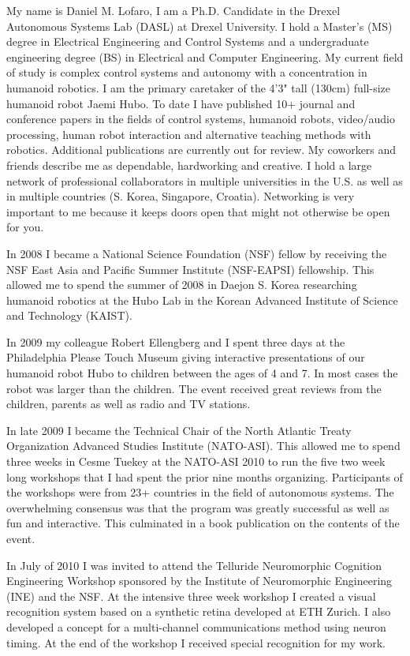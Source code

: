 \documentclass[12pt]{article}
\begin{document}
My name is Daniel M. Lofaro, I am a Ph.D. Candidate in the Drexel Autonomous Systems Lab (DASL) at Drexel University.  I hold a Master's (MS) degree in Electrical Engineering and Control Systems and a undergraduate engineering degree (BS) in Electrical and Computer Engineering.  My current field of study is complex control systems and autonomy with a concentration in humanoid robotics.  I am the primary caretaker of the 4'3" tall (130cm) full-size humanoid robot Jaemi Hubo.  To date I have published 10+ journal and conference papers in the fields of control systems, humanoid robots, video/audio processing, human robot interaction and alternative teaching methods with robotics.  Additional publications are currently out for review.   My coworkers and friends describe me as dependable, hardworking and creative.  I hold a large network of professional collaborators in multiple universities in the U.S. as well as in multiple countries (S. Korea, Singapore, Croatia).  Networking is very important to me because it keeps doors open that might not otherwise be open for you.

In 2008 I became a National Science Foundation (NSF) fellow by receiving the NSF East Asia and Pacific Summer Institute (NSF-EAPSI) fellowship.  This allowed me to spend the summer of 2008 in Daejon S. Korea researching humanoid robotics at the Hubo Lab in the Korean Advanced Institute of Science and Technology (KAIST).

In 2009 my colleague Robert Ellengberg and I spent three days at the Philadelphia Please Touch Museum giving interactive presentations of our humanoid robot Hubo to children between the ages of 4 and 7.  In most cases the robot was larger than the children.  The event received great reviews from the children, parents as well as radio and TV stations.

In late 2009 I became the Technical Chair of the North Atlantic Treaty Organization Advanced Studies Institute (NATO-ASI).  This allowed me to spend three weeks in Cesme Tuekey at the NATO-ASI 2010 to run the five two week long workshops that I had spent the prior nine months organizing.  Participants of the workshops were from 23+ countries in the field of autonomous systems.  The overwhelming consensus was that the program was greatly successful as well as fun and interactive.  This culminated in a book publication on the contents of the event.

In July of 2010 I was invited to attend the Telluride Neuromorphic Cognition Engineering Workshop sponsored by the Institute of Neuromorphic Engineering (INE) and the NSF.  At the intensive three week workshop I created a visual recognition system based on a synthetic retina developed at ETH Zurich.  I also developed a concept for a multi-channel communications method using neuron timing.  At the end of the workshop I received special recognition for my work.
\end{document}
